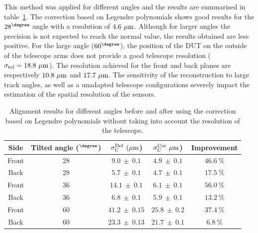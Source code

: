       This method was applied for different angles and the results are summarised in table~\ref{tab:correctionOfDeformation}. 
      The correction based on Legendre polynomials shows good results for the $28^{\degree}$ angle with a resolution of $4.6~\rm{\mu m}$.
      Although for larger angles the precision is not expected to reach the normal value, the results obtained are less positive.
      For the large angle ($60^{\degree}$), the position of the \gls{DUT} on the outside of the telescope arms does not provide a good telescope resolution ($\sigma_{\rm{tel}} = 18.8~\rm{\mu m}$).
      The resolution achieved for the front and back planes are respectively $10.8~\rm{\mu m}$ and $17.7~\rm{\mu m}$.
      The sensitivity of the reconstruction to large track angles, as well as a unadapted telescope configurations severely impact the estimation of the spatial resolution of the sensors.

      \begin{table}[!h]
        \centering
        \begin{tabular}{c c c c c}
          \hline %
          Side &  Tilted angle ($^{\degree}$)  &   $\sigma_{U}^{\rm{Def}}~(\rm{\mu m}$) &   $\sigma_{U}^{\rm{Cor}}~\rm{\mu m}$) & Improvement \\
          \hline %
          \hline %
          Front &      28       & $ 9.0 \ \pm \ 0.1 $ & $ 4.9 \ \pm \ 0.1 $ &    $46.6 \ \%$  \tabularnewline
          Back  &      28       & $ 5.7 \ \pm \ 0.1 $ & $ 4.7 \ \pm \ 0.1 $ &    $17.5 \ \%$  \tabularnewline
          \hline %
          Front &      36       & $ 14.1 \ \pm \ 0.1 $ & $ 6.1 \ \pm \ 0.1 $ &    $56.0 \ \%$ \tabularnewline
          Back  &      36       & $ 6.8 \ \pm \ 0.1 $ & $ 5.9 \ \pm \ 0.1 $ &    $13.2 \ \%$  \tabularnewline
          \hline %
          Front &      60       & $ 41.2 \ \pm \ 0.15$ & $25.8 \ \pm \ 0.2$  &    $37.4 \ \%$ \tabularnewline
          Back  &      60       & $ 23.3 \ \pm \ 0.13$ & $21.7 \ \pm \ 0.1$  &    $6.8 \ \%$  \tabularnewline
          \hline %
        \end{tabular}
        \caption{Alignment results for different angles before and after using the correction based on Legendre polynomials without taking into account the resolution of the telescope.}
        \label{tab:correctionOfDeformation}
      \end{table}


